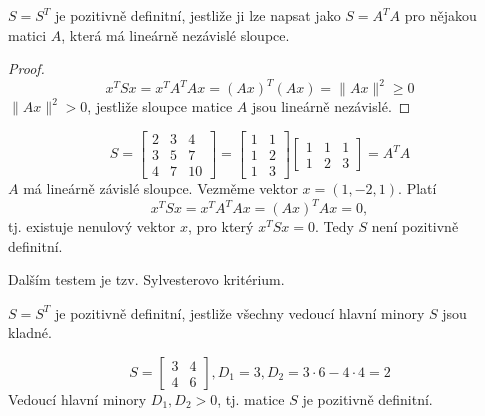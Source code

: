 \begin{vt2}\cite{linear-algebra-and-learning-from-data}
    $S = S^T$ je pozitivně definitní, jestliže ji lze napsat jako $S = A^T A$ pro nějakou matici $A$, která má lineárně nezávislé sloupce.
\end{vt2}
\begin{proof}
    $$
        x^TSx = x^TA^TAx = (Ax)^T(Ax) = \lVert Ax \rVert^2 \geq 0
    $$
    $\lVert Ax \rVert^2 > 0$, jestliže sloupce matice $A$ jsou lineárně nezávislé.
\end{proof}

\begin{pr}
    $$
        S = 
        \begin{bmatrix}
            2 & 3 & 4 \\
            3 & 5 & 7 \\
            4 & 7 & 10
        \end{bmatrix} =
        \begin{bmatrix}
            1 & 1 \\
            1 & 2 \\
            1 & 3
        \end{bmatrix}
        \begin{bmatrix}
            1 & 1 & 1 \\
            1 & 2 & 3
        \end{bmatrix} =
        A^TA
    $$
    $A$ má lineárně závislé sloupce. Vezměme vektor $x = (1, -2, 1)$. Platí
    $$
        x^TSx = x^T A^TA x = (Ax)^T Ax = 0,
    $$
    tj. existuje nenulový vektor $x$, pro který $x^TSx = 0$. Tedy $S$ není pozitivně definitní.
\end{pr}

Dalším testem je tzv. Sylvesterovo kritérium.

\begin{vt2}\cite{linear-algebra-and-learning-from-data}
    $S = S^T$ je pozitivně definitní, jestliže všechny vedoucí hlavní minory $S$ jsou kladné.
\end{vt2}

\begin{pr}
    $$  S =
        \begin{bmatrix}
            3 & 4 \\
            4 & 6
        \end{bmatrix},
        D_1 = 3,
        D_2 = 3 \cdot 6 - 4 \cdot 4 = 2 
    $$
    Vedoucí hlavní minory $D_1, D_2 > 0$, tj. matice $S$ je pozitivně definitní.
\end{pr}

